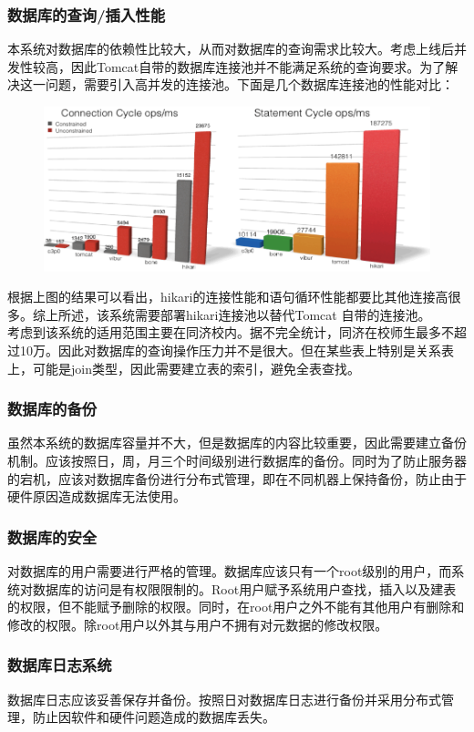 \documentclass[UTF8]{ctexart}
\begin{document}
\subsubsection*{数据库的查询/插入性能}
本系统对数据库的依赖性比较大，从而对数据库的查询需求比较大。考虑上线后并发性较高，因此Tomcat自带的数据库连接池并不能满足系统的查询要求。为了解决这一问题，需要引入高并发的连接池。下面是几个数据库连接池的性能对比：\\
\begin{figure}[H]
\centering
\includegraphics[width = .8\textwidth]{database-compare.png}
\end{figure}
根据上图的结果可以看出，hikari的连接性能和语句循环性能都要比其他连接高很多。综上所述，该系统需要部署hikari连接池以替代Tomcat 自带的连接池。\\
考虑到该系统的适用范围主要在同济校内。据不完全统计，同济在校师生最多不超过10万。因此对数据库的查询操作压力并不是很大。但在某些表上特别是关系表上，可能是join类型，因此需要建立表的索引，避免全表查找。

\subsubsection*{数据库的备份}
虽然本系统的数据库容量并不大，但是数据库的内容比较重要，因此需要建立备份机制。应该按照日，周，月三个时间级别进行数据库的备份。同时为了防止服务器的宕机，应该对数据库备份进行分布式管理，即在不同机器上保持备份，防止由于硬件原因造成数据库无法使用。

\subsubsection*{数据库的安全}
对数据库的用户需要进行严格的管理。数据库应该只有一个root级别的用户，而系统对数据库的访问是有权限限制的。Root用户赋予系统用户查找，插入以及建表的权限，但不能赋予删除的权限。同时，在root用户之外不能有其他用户有删除和修改的权限。除root用户以外其与用户不拥有对元数据的修改权限。

\subsubsection*{数据库日志系统}
数据库日志应该妥善保存并备份。按照日对数据库日志进行备份并采用分布式管理，防止因软件和硬件问题造成的数据库丢失。
\end{document}
